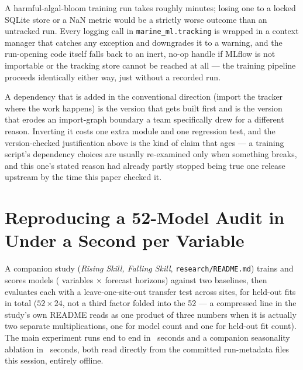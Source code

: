  A harmful-algal-bloom training run
takes roughly \HabRunMinutes{} minutes; losing one to a locked SQLite store or
a NaN metric would be a strictly worse outcome than an untracked run. Every
logging call in \texttt{marine\_ml.tracking} is wrapped in a context manager
that catches any exception and downgrades it to a warning, and the run-opening
code itself falls back to an inert, no-op handle if MLflow is not importable
or the tracking store cannot be reached at all --- the training pipeline
proceeds identically either way, just without a recorded run.

 A dependency that is added in the conventional
direction (import the tracker where the work happens) is the version that
gets built first and is the version that erodes an import-graph boundary a
team specifically drew for a different reason. Inverting it costs one extra
module and one regression test, and the version-checked justification above
is the kind of claim that ages --- a training script's dependency choices are
usually re-examined only when something breaks, and this one's stated reason
had already partly stopped being true one release upstream by the time this
paper checked it.

\section{Reproducing a 52-Model Audit in Under a Second per Variable}
\label{sec:cache}

 A companion study (\emph{Rising Skill, Falling Skill},
\texttt{research/README.md}) trains and scores \NModelsAudited{} models
(\NVariablesAudited{} variables $\times$ \NHorizonsAudited{} forecast
horizons) against two baselines, then evaluates each with a leave-one-site-out
transfer test across \NSitesAudited{} sites, for \NHeldoutFits{} held-out
fits in total (\(52 \times 24\), not a third factor folded into the 52 --- a
compressed line in the study's own README reads as one product of three
numbers when it is actually two separate multiplications, one for model
count and one for held-out fit count). The main experiment runs end to end
in \MainExperimentSeconds{}~seconds and a companion seasonality ablation in
\AblationExperimentSeconds{}~seconds, both read directly from the committed
run-metadata files this session, entirely offline.

